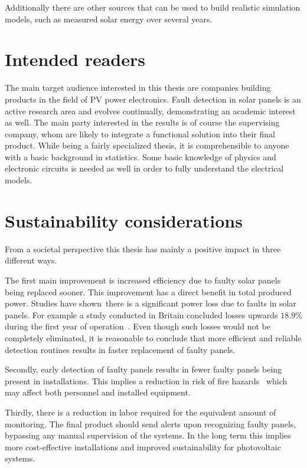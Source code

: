 Additionally there are other sources that can be used to build realistic simulation models, such as measured solar energy over several years.

\section{Intended readers}
The main target audience interested in this thesis are companies building products in the field of PV power electronics.
Fault detection in solar panels is an active research area and evolves continually, demonstrating an academic interest as well.
The main party interested in the results is of course the supervising company, whom are likely to
integrate a functional solution into their final product.
While being a fairly specialized thesis, it is comprehensible to anyone with a basic background in statistics.
Some basic knowledge of physics and electronic circuits is needed as well in order to fully understand the electrical models.

\section{Sustainability considerations}
From a societal perspective this thesis has mainly a positive impact in three different ways.

The first main improvement is increased efficiency due to faulty solar panels being replaced sooner.
This improvement has a direct benefit in total produced power.
Studies have shown there is a significant power loss due to faults in solar panels.
For example a study conducted in Britain concluded losses upwards $18.9\%$ during the first year of operation~\cite{Firth2010}.
Even though such losses would not be completely eliminated, it is reasonable to conclude that more efficient and reliable detection routines results in faster replacement of faulty panels.

Secondly, early detection of faulty panels results in fewer faulty panels being present in installations.
This implies a reduction in risk of fire hazards~\cite{Zhao2010night} which may affect both personnel and installed equipment.

Thirdly, there is a reduction in labor required for the equivalent amount of monitoring.
The final product should send alerts upon recognizing faulty panels, bypassing any manual supervision of the systems.
In the long term this implies more cost-effective installations and improved sustainability for photovoltaic systems.

